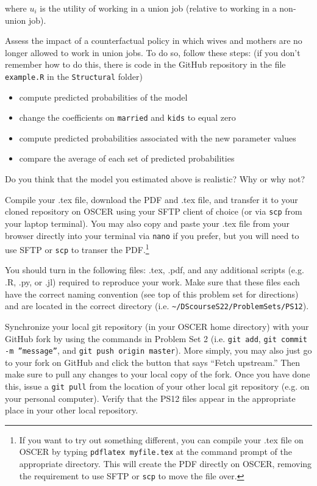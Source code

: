 \documentclass[12pt,english]{exam}
\begin{document}
\begin{questions}
where $u_{i}$ is the utility of working in a union job (relative to working in a non-union job).

\question Assess the impact of a counterfactual policy in which wives and mothers are no longer allowed to work in union jobs. To do so, follow these steps: (if you don't remember how to do this, there is code in the GitHub repository in the file \texttt{example.R} in the \texttt{Structural} folder)
\begin{itemize}
    \item compute predicted probabilities of the model
    \item change the coefficients on \texttt{married} and \texttt{kids} to equal zero
    \item compute predicted probabilities associated with the new parameter values
    \item compare the average of each set of predicted probabilities
\end{itemize}

Do you think that the model you estimated above is realistic? Why or why not?

\question Compile your .tex file, download the PDF and .tex file, and transfer it to your cloned repository on OSCER using your SFTP client of choice (or via \texttt{scp} from your laptop terminal). You may also copy and paste your .tex file from your browser directly into your terminal via \texttt{nano} if you prefer, but you will need to use SFTP or \texttt{scp} to transer the PDF.\footnote{If you want to try out something different, you can compile your .tex file on OSCER by typing \texttt{pdflatex myfile.tex} at the command prompt of the appropriate directory. This will create the PDF directly on OSCER, removing the requirement to use SFTP or \texttt{scp} to move the file over.}

\question You should turn in the following files: .tex, .pdf, and any additional scripts (e.g. .R, .py, or .jl) required to reproduce your work.  Make sure that these files each have the correct naming convention (see top of this problem set for directions) and are located in the correct directory (i.e. \texttt{\textasciitilde/DScourseS22/ProblemSets/PS12}).

\question Synchronize your local git repository (in your OSCER home directory) with your GitHub fork by using the commands in Problem Set 2 (i.e. \texttt{git add}, \texttt{git commit -m ''message''}, and \texttt{git push origin master}). More simply, you may also just go to your fork on GitHub and click the button that says ``Fetch upstream.'' Then make sure to pull any changes to your local copy of the fork. Once you have done this, issue a \texttt{git pull} from the location of your other local git repository (e.g. on your personal computer). Verify that the PS12 files appear in the appropriate place in your other local repository.

\end{questions}
\end{document}
